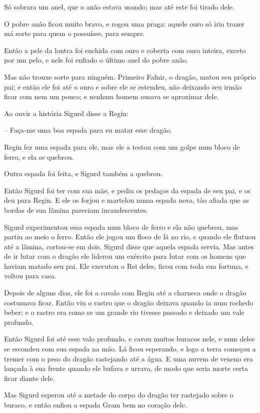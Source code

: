Só sobrara um anel, que o anão estava usando; mas até este foi tirado
dele. 

O pobre anão ficou muito bravo, e rogou uma praga: aquele ouro só iria
trazer má sorte para quem o possuísse, para sempre. 

Então a pele da lontra foi enchida com ouro e coberta com ouro
inteira, exceto por um pelo, e nele foi enfiado o último anel do
pobre anão. 

Mas não trouxe sorte para ninguém. Primeiro Fafnir, o dragão, matou
seu próprio pai; e então ele foi até o ouro e sobre ele se estendeu,
não deixando seu irmão ficar com nem um pouco; e nenhum homem ousava
se aproximar dele. 

Ao ouvir a história Sigurd disse a Regin:

-- Faça-me uma boa espada para eu matar esse dragão. 

Regin fez uma espada para ele, mas ele a testou com um golpe num bloco
de ferro, e ela se quebrou. 

Outra espada foi feita, e Sigurd também a quebrou. 

Então Sigurd foi ter com sua mãe, e pediu os pedaços da espada de seu
pai, e os deu para Regin. E ele os forjou e martelou numa espada
nova, tão afiada que as bordas de sua lâmina pareciam incandescentes.

Sigurd experimentou essa espada num bloco de ferro e ela não quebrou,
mas partiu ao meio o ferro. Então ele jogou um floco de lã no rio, e
quando ele flutuou até a lâmina, cortou-se em dois. Sigurd disse que
aquela espada servia. Mas antes de ir lutar com o dragão ele liderou
um exército para lutar com os homens que haviam matado seu pai. Ele
executou o Rei deles, ficou com toda sua fortuna, e voltou para casa.


Depois de alguns dias, ele foi a cavalo com Regin até a charneca onde
o dragão costumava ficar. Então viu o rastro que o dragão deixava
quando ia num rochedo beber; e o rastro era como se um grande rio
tivesse passado e deixado um vale profundo. 

Então Sigurd foi até esse valo profundo, e cavou muitos buracos nele,
e num deles se escondeu com sua espada na mão. Lá ficou esperando, e
logo a terra começou a tremer com o peso do dragão rastejando até a
água. E uma nuvem de veneno era lançada à sua frente quando ele
bufava e urrava, de modo que seria morte certa ficar diante dele. 

Mas Sigurd esperou até a metade do corpo do dragão ter rastejado sobre
o buraco, e então enfiou a espada Gram bem no coração dele. 


